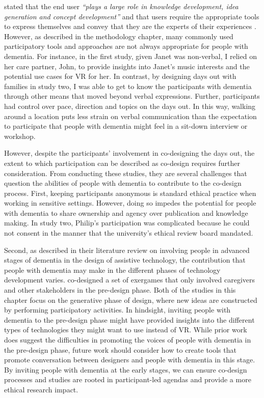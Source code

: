 \cite{sanders2008co} stated that the end user \textit{``plays a large role in knowledge development, idea generation and concept development''} and that users require the appropriate tools to express themselves and convey that they are the experts of their experiences \citep{visser2005contextmapping}. However, as described in the methodology chapter, many commonly used participatory tools and approaches are not always appropriate for people with dementia. For instance, in the first study, given Janet was non-verbal, I relied on her care partner, John, to provide insights into Janet's music interests and the potential use cases for VR for her. In contrast, by designing days out with families in study two, I was able to get to know the participants with dementia through other means that moved beyond verbal expressions. Further, participants had control over pace, direction and topics on the days out. In this way, walking around a location puts less strain on verbal communication than the expectation to participate that people with dementia might feel in a sit-down interview or workshop. 

However, despite the participants' involvement in co-designing the days out, the extent to which participation can be described as co-design requires further consideration. From conducting these studies, they are several challenges that question the abilities of people with dementia to contribute to the co-design process. First, keeping participants anonymous is standard ethical practice when working in sensitive settings. However, doing so impedes the potential for people with dementia to share ownership and agency over publication and knowledge making. In study two, Philip's participation was complicated because he could not consent in the manner that the university's ethical review board mandated.

Second, as \cite{suijkerbuijk_active_2019} described in their literature review on involving people in advanced stages of dementia in the design of assistive technology, the contribution that people with dementia may make in the different phases of technology development varies. \cite{unbehaun_facilitating_2018} co-designed a set of exergames that only involved caregivers and other stakeholders in the pre-design phase. Both of the studies in this chapter focus on the generative phase of design, where new ideas are constructed by performing participatory activities. In hindsight, inviting people with dementia to the pre-design phase might have provided insights into the different types of technologies they might want to use instead of VR. While prior work does suggest the difficulties in promoting the voices of people with dementia in the pre-design phase, future work should consider how to create tools that promote conversation between designers and people with dementia in this stage. By inviting people with dementia at the early stages, we can ensure co-design processes and studies are rooted in participant-led agendas and provide a more ethical research impact.


